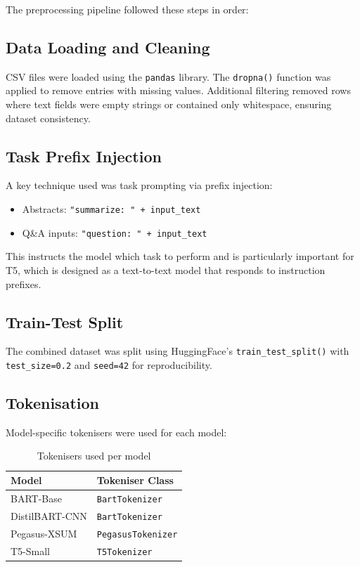 \documentclass[12pt, a4paper]{report}
\begin{document}
The preprocessing pipeline followed these steps in order:

\subsection{Data Loading and Cleaning}
CSV files were loaded using the \texttt{pandas} library. The \texttt{dropna()} function was applied to remove entries with missing values. Additional filtering removed rows where text fields were empty strings or contained only whitespace, ensuring dataset consistency.

\subsection{Task Prefix Injection}
A key technique used was task prompting via prefix injection:
\begin{itemize}
    \item Abstracts: \texttt{"summarize: " + input\_text}
    \item Q\&A inputs: \texttt{"question: " + input\_text}
\end{itemize}
This instructs the model which task to perform and is particularly important for T5, which is designed as a text-to-text model that responds to instruction prefixes.

\subsection{Train-Test Split}
The combined dataset was split using HuggingFace's \texttt{train\_test\_split()} with \texttt{test\_size=0.2} and \texttt{seed=42} for reproducibility.

\subsection{Tokenisation}
Model-specific tokenisers were used for each model:

\begin{table}[H]
\centering
\caption{Tokenisers used per model}
\begin{tabular}{ll}
\toprule
\textbf{Model} & \textbf{Tokeniser Class} \\
\midrule
BART-Base & \texttt{BartTokenizer} \\
DistilBART-CNN & \texttt{BartTokenizer} \\
Pegasus-XSUM & \texttt{PegasusTokenizer} \\
T5-Small & \texttt{T5Tokenizer} \\
\bottomrule
\end{tabular}
\end{table}
\end{document}
